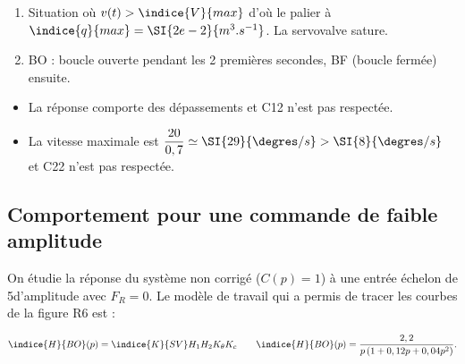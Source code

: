 \ifprof
\begin{corrige}
\begin{enumerate}
\item Situation où $v(t) > \indice{V}{max}$ d'où le palier à $\indice{q}{max} = \SI{2e-2}{m^3.s^{-1}}$. 
La servovalve sature.
\item BO : boucle ouverte pendant les 2 premières secondes, BF (boucle fermée) ensuite.
\end{enumerate}
\end{corrige}
\else
\fi


\vspace{.5cm}

\ifprof
\begin{corrige}
\begin{itemize}
\item La réponse comporte des dépassements et C12 n'est pas respectée.
\item La vitesse maximale est  $\dfrac{20}{0,7}\simeq \SI{29}{\degres/s}>\SI{8}{\degres/s}$  et C22 n'est pas respectée.
\end{itemize}

\end{corrige}
\else
\fi



\subsection{Comportement pour une commande de faible amplitude}

\ifprof
\else
On étudie la réponse du système non corrigé ($C(p) = 1$) à une entrée échelon de 5\degres d’amplitude avec $F_R = 0$. Le modèle de travail qui a permis de tracer les courbes de la figure R6 est :

$$ 
\indice{H}{BO}(p)=\indice{K}{SV}H_1 H_2 K_{\theta} K_c 
\quad \quad 
\indice{H}{BO}(p)=\dfrac{2,2}{p\left( 1+0,12p+0,04 p^2\right)}.
$$
\fi

